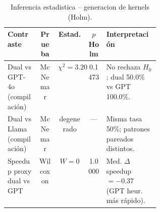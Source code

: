 \begin{table}[ht]
\centering
\caption{Inferencia estadistica -- generacion de kernels (Holm).}
\label{tab:gen_infer}
\footnotesize
\begin{adjustbox}{max width=\linewidth}
\begin{tabularx}{\linewidth}{@{}lcccp{0.35\linewidth}@{}}
\toprule
Contraste & Prueba & Estad. & $p$ Holm & Interpretación \\
\midrule
Dual vs GPT-4o (compilación) & McNemar & $\chi^2=3.20$ & 0.1473 & No rechaza $H_0$; dual 50.0\% vs GPT 100.0\%. \\
Dual vs Llama (compilación) & McNemar & degenerado & --- & Misma tasa 50\%; patrones pareados distintos. \\
Speedup proxy dual vs GPT & Wilcoxon & $W=0$ & 1.0000 & Med. $\Delta$ speedup $=-0.37$ (GPT heur. más rápido). \\
\bottomrule
\end{tabularx}
\end{adjustbox}
\end{table}
